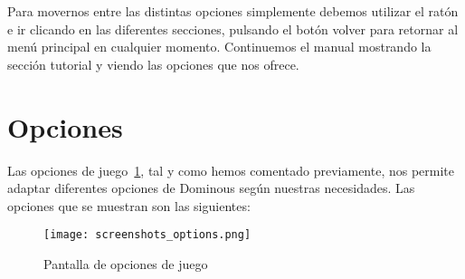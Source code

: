 Para movernos entre las distintas opciones simplemente debemos utilizar el ratón e ir clicando en las diferentes secciones,
pulsando el botón volver para retornar al menú principal en cualquier momento. Continuemos el manual mostrando la sección
tutorial y viendo las opciones que nos ofrece.


\section{Opciones}

Las opciones de juego~\ref{fig:screenshotsoptions}, tal y como hemos comentado previamente, nos permite adaptar diferentes opciones de Dominous según
nuestras necesidades. Las opciones que se muestran son las siguientes:

\begin{figure}[h]
  \begin{center}
    \texttt{[image: screenshots\_options.png]}
  \end{center}
  \caption{Pantalla de opciones de juego}
  \label{fig:screenshotsoptions}
\end{figure}

